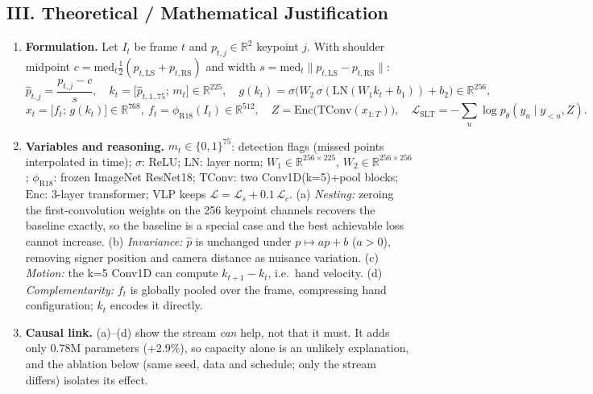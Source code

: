 \documentclass[8pt,a4paper]{article}
\begin{document}
\subsection*{III. Theoretical / Mathematical Justification}
\begin{enumerate}
    \item \textbf{Formulation.} Let $I_t$ be frame $t$ and $p_{t,j}\in\mathbb{R}^2$ keypoint $j$. With shoulder midpoint $c=\mathrm{med}_t\tfrac{1}{2}(p_{t,\mathrm{LS}}+p_{t,\mathrm{RS}})$ and width $s=\mathrm{med}_t\lVert p_{t,\mathrm{LS}}-p_{t,\mathrm{RS}}\rVert$:
    \begin{equation*}
    \hat p_{t,j}=\frac{p_{t,j}-c}{s},\quad
    k_t=\big[\hat p_{t,1..75};\,m_t\big]\in\mathbb{R}^{225},\quad
    g(k_t)=\sigma\!\big(W_2\,\sigma(\mathrm{LN}(W_1k_t+b_1))+b_2\big)\in\mathbb{R}^{256},
    \end{equation*}
    \begin{equation*}
    x_t=\big[f_t;\,g(k_t)\big]\in\mathbb{R}^{768},\ f_t=\phi_{\mathrm{R18}}(I_t)\in\mathbb{R}^{512},\quad
    Z=\mathrm{Enc}\big(\mathrm{TConv}(x_{1:T})\big),\quad
    \mathcal{L}_{\mathrm{SLT}}=-\textstyle\sum_u\log p_\theta(y_u\mid y_{<u},Z).
    \end{equation*}
    \item \textbf{Variables and reasoning.} $m_t\in\{0,1\}^{75}$: detection flags (missed points interpolated in time); $\sigma$: ReLU; $\mathrm{LN}$: layer norm; $W_1\in\mathbb{R}^{256\times225}$, $W_2\in\mathbb{R}^{256\times256}$; $\phi_{\mathrm{R18}}$: frozen ImageNet ResNet18; $\mathrm{TConv}$: two Conv1D(k=5)+pool blocks; $\mathrm{Enc}$: 3-layer transformer; VLP keeps $\mathcal{L}=\mathcal{L}_s+0.1\,\mathcal{L}_c$. (a) \emph{Nesting:} zeroing the first-convolution weights on the 256 keypoint channels recovers the baseline exactly, so the baseline is a special case and the best achievable loss cannot increase. (b) \emph{Invariance:} $\hat p$ is unchanged under $p\mapsto ap+b$ ($a>0$), removing signer position and camera distance as nuisance variation. (c) \emph{Motion:} the k=5 Conv1D can compute $k_{t+1}-k_t$, i.e.\ hand velocity. (d) \emph{Complementarity:} $f_t$ is globally pooled over the frame, compressing hand configuration; $k_t$ encodes it directly.
    \item \textbf{Causal link.} (a)--(d) show the stream \emph{can} help, not that it must. It adds only 0.78M parameters (+2.9\%), so capacity alone is an unlikely explanation, and the ablation below (same seed, data and schedule; only the stream differs) isolates its effect.
\end{enumerate}
\end{document}
